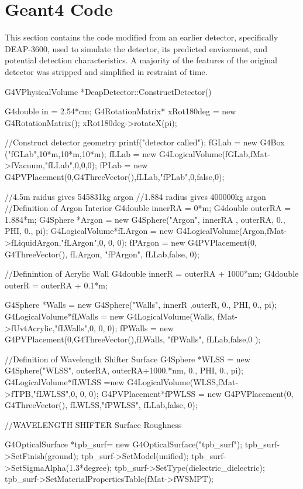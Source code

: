 \documentclass[11pt,a4paper,oneside]{report}
\begin{document}
\chapter{Geant4 Code}
This section contains the code modified from an earlier detector, specifically DEAP-3600, used to simulate the detector, its predicted enviorment, and potential detection characteristics. A majority of the features of the original detector was stripped and simplified in restraint of time. 
\begin{code}
G4VPhysicalVolume *DeapDetector::ConstructDetector() {

G4double in                = 2.54*cm;
G4RotationMatrix* xRot180deg = new G4RotationMatrix();
xRot180deg->rotateX(pi);

//Construct detector geometry
    printf("\n\nconstruct detector called\n\n\n");
    fGLab	= new G4Box ("fGLab",10*m,10*m,10*m);
    fLLab	= new G4LogicalVolume(fGLab,fMat->fVacuum,"fLLab",0,0,0);
    fPLab	= new G4PVPlacement(0,G4ThreeVector(),fLLab,"fPLab",0,false,0);
	
	//4.5m raidus gives 545831kg argon
	//1.884 radius gives 400000kg argon
//Definition of Argon Interior
	G4double innerRA = 0*m;
	G4double outerRA = 1.884*m;
	G4Sphere *Argon
= new G4Sphere("Argon", innerRA , outerRA, 0., PHI, 0., pi);
	G4LogicalVolume*fLArgon
= new G4LogicalVolume(Argon,fMat->fLiquidArgon,"fLArgon",0, 0, 0);
	fPArgon
= new G4PVPlacement(0, G4ThreeVector(), fLArgon,  "fPArgon",  fLLab,false, 0);

//Definintion of Acrylic Wall
	G4double innerR = outerRA + 1000*nm;
	G4double outerR = outerRA + 0.1*m;

	G4Sphere *Walls
= new G4Sphere("Walls", innerR ,outerR, 0., PHI, 0., pi);
	G4LogicalVolume*fLWalls
= new G4LogicalVolume(Walls,   fMat->fUvtAcrylic,"fLWalls",0, 0, 0);
	fPWalls
= new G4PVPlacement(0,G4ThreeVector(),fLWalls, "fPWalls", fLLab,false,0 );
		
//Definition of Wavelength Shifter Surface
	G4Sphere *WLSS 
= new G4Sphere("WLSS", outerRA, outerRA+1000.*nm, 0., PHI, 0., pi);
	G4LogicalVolume*fLWLSS
=new G4LogicalVolume(WLSS,fMat->fTPB,"fLWLSS",0, 0, 0);
	G4PVPlacement*fPWLSS
= new G4PVPlacement(0, G4ThreeVector(), fLWLSS,"fPWLSS",  fLLab,false, 0);
	
//WAVELENGTH SHIFTER Surface Roughness
		
	G4OpticalSurface *tpb_surf= new G4OpticalSurface("tpb_surf");
		tpb_surf->SetFinish(ground);
		tpb_surf->SetModel(unified);
		tpb_surf->SetSigmaAlpha(1.3*degree);
		tpb_surf->SetType(dielectric_dielectric);
		tpb_surf->SetMaterialPropertiesTable(fMat->fWSMPT);
	
}
\end{code}
\end{document}
